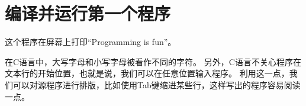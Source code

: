 \chapter{编译并运行第一个程序}
{
    这个程序在屏幕上打印``Programming is fun''。

    \begin{codelist}
        
    \end{codelist}

    在C语言中，大写字母和小写字母被看作不同的字符。
    另外，C语言不关心程序在文本行的开始位置，也就是说，我们可以在任意位置输入程序。
    利用这一点，我们可以对源程序进行排版，比如使用Tab键缩进某些行，这样写出的程序容易阅读一点。

    
    
    
    
    
    
}

\cleardoublepage

\endinput
